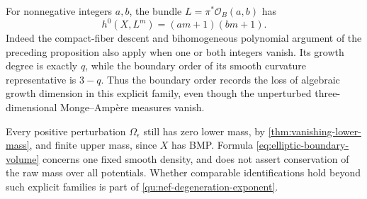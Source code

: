 For nonnegative integers $a,b$, the bundle $L=\pi^*\mathcal O_B(a,b)$ has
\[
 h^0(X,L^m)=(am+1)(bm+1).
\]
Indeed the compact-fiber descent and bihomogeneous polynomial argument of the preceding proposition also apply when one or both integers vanish. Its growth degree is exactly $q$, while the boundary order of its smooth curvature representative is $3-q$. Thus the boundary order records the loss of algebraic growth dimension in this explicit family, even though the unperturbed three-dimensional Monge--Amp\`ere measures vanish.

Every positive perturbation $\Omega_\epsilon$ still has zero lower mass, by \cref{thm:vanishing-lower-mass}, and finite upper mass, since $X$ has BMP. Formula \eqref{eq:elliptic-boundary-volume} concerns one fixed smooth density, and does not assert conservation of the raw mass over all potentials. Whether comparable identifications hold beyond such explicit families is part of \cref{qu:nef-degeneration-exponent}.
